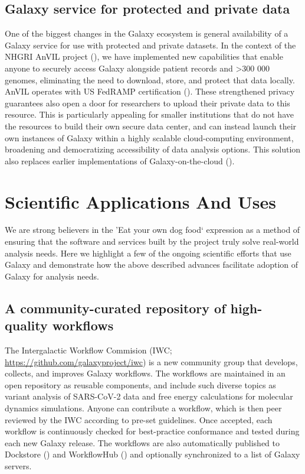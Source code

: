 \subsection*{Galaxy service for protected and private data}
One of the biggest changes in the Galaxy ecosystem is general availability of a Galaxy service for use with protected and private datasets. In the context of the NHGRI AnVIL project (\cite{Schatz_2022}), we have implemented new capabilities that enable anyone to securely access Galaxy alongside patient records and >300 000 genomes, eliminating the need to download, store, and protect that data locally. AnVIL operates with US FedRAMP certification (\cite{Taylor_2014}). These strengthened privacy guarantees also open a door for researchers to upload their private data to this resource. This is particularly appealing for smaller institutions that do not have the resources to build their own secure data center, and can instead launch their own instances of Galaxy within a highly scalable cloud-computing environment, broadening and democratizing accessibility of data analysis options. This solution also replaces earlier implementations of Galaxy-on-the-cloud (\cite{Afgan_2011}).

\section*{Scientific Applications And Uses}
We are strong believers in the 'Eat your own dog food` expression as a method of ensuring that the software and services built by the project truly solve real-world analysis needs. Here we highlight a few of the ongoing scientific efforts that use Galaxy and demonstrate how the above described advances facilitate adoption of Galaxy for analysis needs.


\subsection*{A community-curated repository of high-quality workflows}
The Intergalactic Workflow Commision (IWC; \url{https://github.com/galaxyproject/iwc}) is a new community group that develops, collects, and improves Galaxy workflows. The workflows are maintained in an open repository as reusable components, and include such diverse topics as variant analysis of SARS-CoV-2 data and free energy calculations for molecular dynamics simulations. Anyone can contribute a workflow, which is then peer reviewed by the IWC according to pre-set guidelines. Once accepted, each workflow is continuously checked for best-practice conformance and tested during each new Galaxy release. The workflows are also automatically published to Dockstore (\cite{O_Connor_2017}) and WorkflowHub (\cite{carole_goble_2021_4605654}) and optionally synchronized to a list of Galaxy servers.


